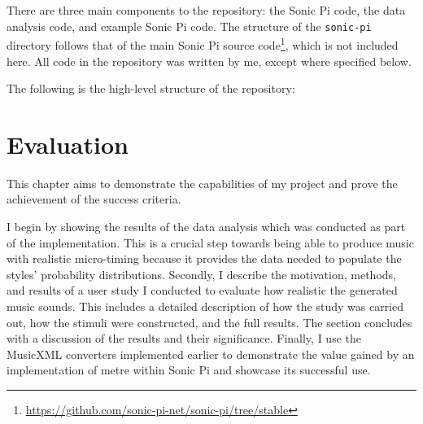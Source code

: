 \documentclass[12pt,twoside,openright]{report}
\begin{document}
There are three main components to the repository: the Sonic Pi code, the data analysis code, and example Sonic Pi code. The structure of the \verb'sonic-pi' directory follows that of the main Sonic Pi source code\footnote{\url{https://github.com/sonic-pi-net/sonic-pi/tree/stable}}, which is not included here. All code in the repository was written by me, except where specified below.

The following is the high-level structure of the repository:
\vspace{3mm}





\chapter{Evaluation} \label{evaluation}

This chapter aims to demonstrate the capabilities of my project and prove the
achievement of the success criteria.

I begin by showing the results of the
data analysis which was conducted as part of the implementation. This is a
crucial step towards being able to produce music with realistic micro-timing
because it provides the data needed to populate the styles' probability
distributions. Secondly, I describe the motivation, methods, and results of
a user study I conducted to evaluate how realistic the generated music sounds.
This includes a detailed description of how the study was carried out, how the
stimuli were constructed, and the full results. The section concludes with a
discussion of the results and their significance. Finally, I use the MusicXML
converters implemented earlier to demonstrate the value gained by an
implementation of metre within Sonic Pi and showcase its successful use.
\end{document}
